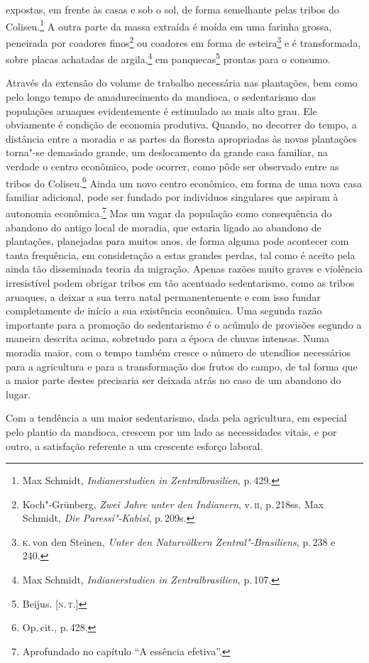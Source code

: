 expostas, em frente às casas e sob o sol, de forma semelhante pelas tribos
do Coliseu.\footnote{Max Schmidt,
  \textit{Indianerstudien in Zentralbrasilien}, p.\,429.} A outra parte da
massa extraída é moída em uma farinha grossa, peneirada por coadores
finos\footnote{Koch"-Grünberg, \textit{Zwei Jahre unter den Indianern}, v.\,\textsc{ii}, p.\,218ss. Max Schmidt, \textit{Die Paressí"-Kabisí}, p.\,209s.} ou
coadores em forma de esteira\footnote{\textsc{k}.\,von den Steinen, \textit{Unter
  den Naturvölkern Zentral"-Brasiliens}, p.\,238 e 240.} e é transformada,
sobre placas achatadas de argila,\footnote{Max Schmidt,
  \textit{Indianerstudien in Zentralbrasilien}, p.\,107.} em panquecas\footnote{Beijus. {[}\textsc{n.\,t.}{]}}
 prontas para o consumo.

Através da extensão do volume de trabalho necessária nas plantações, bem
como pelo longo tempo de amadurecimento da mandioca, o sedentarismo das
populações aruaques evidentemente é estimulado ao mais alto grau. Ele
obviamente é condição de economia produtiva. Quando, no decorrer do
tempo, a distância entre a moradia e as partes da floresta apropriadas às
novas plantações torna"-se demasiado grande, um deslocamento da
grande casa familiar, na verdade o centro econômico, pode ocorrer, como
pôde ser observado entre as tribos do Coliseu.\footnote{Op.\,cit., p.\,428.}
Ainda um novo centro econômico, em forma de uma nova casa familiar
adicional, pode ser fundado por indivíduos singulares que aspiram à
autonomia econômica.\footnote{Aprofundado no capítulo ``A essência efetiva''.} Mas um vagar da população
como consequência do abandono do antigo local de moradia, que estaria
ligado ao abandono de plantações, planejadas para muitos anos, de forma
alguma pode acontecer com tanta frequência, em consideração a estas
grandes perdas, tal como é aceito pela ainda tão disseminada teoria da
migração. Apenas razões muito graves e violência irresistível podem
obrigar tribos em tão acentuado sedentarismo, como as tribos aruaques, a
deixar a sua terra natal permanentemente e com isso fundar
completamente de início a sua existência econômica. Uma segunda razão
importante para a promoção do sedentarismo é o acúmulo de provisões
segundo a maneira descrita acima, sobretudo para a época de chuvas
intensas. Numa moradia maior, com o tempo também cresce o
número de utensílios necessários para a agricultura e para a
transformação dos frutos do campo, de tal forma que a maior parte destes
precisaria ser deixada atrás no caso de um abandono do lugar.

Com a tendência a um maior sedentarismo, dada pela agricultura, em
especial pelo plantio da mandioca, crescem por um lado as necessidades
vitais, e por outro, a satisfação referente a um
crescente esforço laboral.

